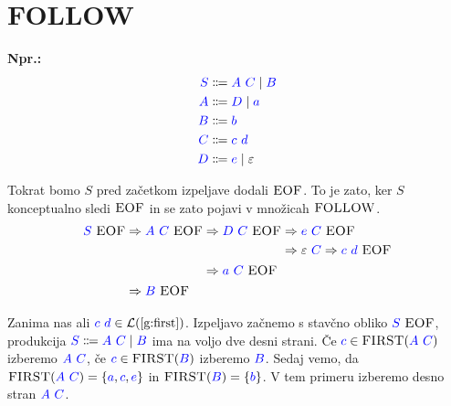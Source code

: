 \documentclass{article}
\newcommand{\Ex}{\textbf{Npr.:}\ }
\newcommand{\FIRST}{\textsc{FIRST}}
\newcommand{\FOLLOW}{\textsc{FOLLOW}}
\newcommand{\EOF}{\textsc{EOF}}
\newcommand{\Symbol}[1]{\textcolor{blue}{#1}}
\newcommand{\Null}{\varepsilon}
\newcommand{\Language}[1]{\mathcal{L}(#1)}
\newcommand{\Arrow}{\Coloneqq}
\newcommand{\Derive}{\Rightarrow}
\newcommand{\Seq}{\ }
\newcommand{\Union}{\mathrel{|}}
\begin{document}
\section{\FOLLOW}
\Ex
  \begin{equation*}
  \begin{aligned}
    \Symbol{S} &\Arrow \Symbol{A} \Seq \Symbol{C} \Union \Symbol{B} \\
    \Symbol{A} &\Arrow \Symbol{D} \Union \Symbol{a} \\
    \Symbol{B} &\Arrow \Symbol{b}\\
    \Symbol{C} &\Arrow \Symbol{c} \Seq \Symbol{d}\\
    \Symbol{D} &\Arrow \Symbol{e} \Union \Null
  \end{aligned}
\end{equation*}

Tokrat bomo $S$ pred začetkom izpeljave dodali $\EOF$.
To je zato, ker $S$ konceptualno sledi $\EOF$ in se zato pojavi v množicah $\FOLLOW$.
\begin{equation*}
  \Symbol{S} \Seq \EOF \begin{aligned}[t]
    &\Derive \Symbol{A} \Seq \Symbol{C} \Seq \EOF \begin{aligned}[t]
      &\Derive \Symbol{D} \Seq \Symbol{C} \Seq \EOF \begin{aligned}[t]
        &\Derive \Symbol{e} \Seq \Symbol{C} \Seq \EOF\\
        &\Derive \Null \Seq \Symbol{C} \Derive \Symbol{c} \Seq \Symbol{d} \Seq \EOF
      \end{aligned}\\
      &\Derive \Symbol{a} \Seq \Symbol{C} \Seq \EOF
    \end{aligned}\\
    &\Derive \Symbol{B} \Seq \EOF
  \end{aligned}
\end{equation*}

Zanima nas ali $\Symbol{c} \Seq \Symbol{d} \in \Language{\text{\ref{g:first}}}$.
Izpeljavo začnemo s stavčno obliko $\Symbol{S} \Seq \EOF$, produkcija $\Symbol{S} \Arrow \Symbol{A} \Seq \Symbol{C} \Union \Symbol{B}$ ima na voljo dve desni strani.
Če $\Symbol{c} \in \FIRST(\Symbol{A} \Seq \Symbol{C})$ izberemo $\Symbol{A} \Seq \Symbol{C}$, če $\Symbol{c} \in \FIRST(\Symbol{B})$ izberemo $\Symbol{B}$.
Sedaj vemo, da $\FIRST(\Symbol{A} \Seq \Symbol{C}) = \{\Symbol{a}, \Symbol{c}, \Symbol{e}\}$ in $\FIRST(\Symbol{B}) = \{\Symbol{b}\}$.
V tem primeru izberemo desno stran $\Symbol{A} \Seq \Symbol{C}$.
\end{document}
